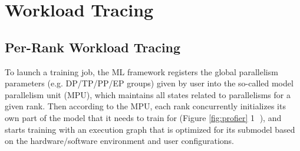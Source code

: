 
\section{Workload Tracing } 
\label{sec:workload_const_replay} 





\subsection{Per-Rank Workload Tracing} 
\label{subsec:workload_const}


To launch a training job, the ML framework registers the global parallelism parameters (e.g. DP/TP/PP/EP groups) given by user into the so-called model parallelism unit (MPU), which maintains all states related to parallelisms for a given rank.
Then according to the MPU, each rank concurrently initializes its own part of the model that it needs to train for (Figure \ref{fig:profier} \textcircled{1}
), and starts training with an execution graph that is optimized for its submodel based on the hardware/software environment and user configurations. 

